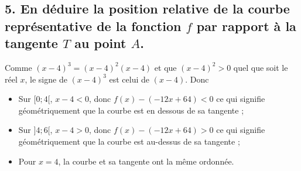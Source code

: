 \documentclass[10pt]{article}
\begin{document}
	\subsection*{5. En déduire la position relative de la courbe représentative de la fonction $f$ par rapport à la tangente $T$ au point $A$.}
	
	Comme $(x - 4)^3 = (x - 4)^2 (x - 4)$ et que $(x - 4)^2 > 0$ quel que soit le réel $x$, le signe de $(x - 4)^3$ est celui de $(x - 4)$. Donc
	\begin{itemize}
		\item Sur $[0; 4[$, $x - 4 < 0$, donc $f(x) - (-12x + 64) < 0$ ce qui signifie géométriquement que la courbe est en dessous de sa tangente ;
		\item Sur $]4; 6[$, $x - 4 > 0$, donc $f(x) - (-12x + 64) > 0$ ce qui signifie géométriquement que la courbe est au-dessus de sa tangente ;
		\item Pour $x = 4$, la courbe et sa tangente ont la même ordonnée.
	\end{itemize}
\end{document}
